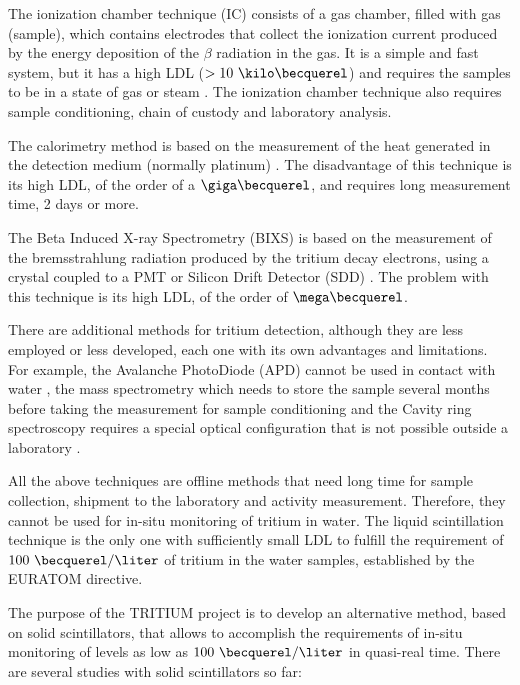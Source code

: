 The ionization chamber technique (IC) consists of a gas chamber, filled with gas (sample), which contains electrodes that collect the ionization current produced by the energy deposition of the $\beta$ radiation in the gas. It is a simple and fast system, but it has a high LDL ($> 10~\kilo\becquerel$) and requires the samples to be in a state of gas or steam \cite{IonizationChamber1, IonizationChamber2}. The ionization chamber technique also requires sample conditioning, chain of custody and laboratory analysis. 

The calorimetry method is based on the measurement of the heat generated in the detection medium (normally platinum) \cite{Calorimeter1, Calorimeter2}. The disadvantage of this technique is its high LDL, of the order of a $\giga\becquerel$, and requires long measurement time, 2 days or more.

The Beta Induced X-ray Spectrometry (BIXS) is based on the measurement of the bremsstrahlung radiation produced by the tritium decay electrons, using a  crystal coupled to a PMT  \cite{XRays1, XRays2} or Silicon Drift Detector (SDD) \cite{Bremstrahlung}. The problem with this technique is its high LDL, of the order of $\mega\becquerel$.

There are additional methods for tritium detection, although they are less employed or less developed, each one with its own advantages and limitations. For example, the Avalanche PhotoDiode (APD) cannot be used in contact with water \cite{APD},  the mass spectrometry which needs to store the sample several months before taking the measurement for sample conditioning \cite{Spectrometry} and the Cavity ring spectroscopy requires a special optical configuration that is not possible outside a laboratory \cite{Ring}.

All the above techniques are offline methods that need long time for sample collection, shipment to the laboratory and activity measurement. Therefore, they cannot be used for in-situ monitoring of tritium in water. The liquid scintillation technique is the only one with sufficiently small LDL to fulfill the requirement of $100~\becquerel/\liter$ of tritium in the water samples, established by the EURATOM directive. 

The purpose of the TRITIUM project is to develop an alternative method, based on solid scintillators, that allows to accomplish the requirements of in-situ monitoring of levels as low as $100~\becquerel/\liter$ in quasi-real time. There are several studies with solid scintillators so far:

